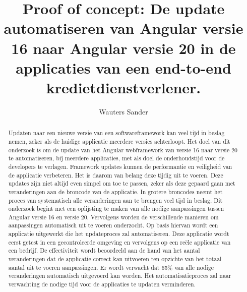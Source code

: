 \documentclass{hogent-article}
\title{Proof of concept: De update automatiseren van Angular versie 16 naar Angular versie 20 in de applicaties van een end-to-end kredietdienstverlener.}
\author{Wauters Sander}
\begin{document}
\begin{abstract}

Updaten naar een nieuwe versie van een softwareframework kan veel tijd in beslag nemen, zeker als de huidige applicatie meerdere versies achterloopt.
Het doel van dit onderzoek is om de update van het Angular webframework van versie 16 naar versie 20 te automatiseren, bij meerdere applicaties, met als doel de onderhoudstijd voor de developers te verlagen.
Framework updates kunnen de performantie en veiligheid van de applicatie verbeteren.
Het is daarom van belang deze tijdig uit te voeren.
Deze updates zijn niet altijd even simpel om toe te passen, zeker als deze gepaard gaan met veranderingen aan de broncode van de applicatie.
In grotere broncodes neemt het proces van systematisch alle veranderingen aan te brengen veel tijd in beslag.
Dit onderzoek begint met een oplijsting te maken van alle nodige aanpassingen tussen Angular versie 16 en versie 20.
Vervolgens worden de verschillende manieren om aanpassingen automatisch uit te voeren onderzocht.
Op basis hiervan wordt een applicatie uitgewerkt die het updateproces zal automatiseren.
Deze applicatie wordt eerst getest in een gecontroleerde omgeving en vervolgens op een reële applicatie van een bedrijf.
De effectiviteit wordt beoordeeld aan de hand van het aantal veranderingen dat de applicatie correct kan uitvoeren ten opzichte van het totaal aantal uit te voeren aanpassingen.
Er wordt verwacht dat 65\% van alle nodige veranderingen automatisch uitgevoerd kan worden.
Het automatisatieproces zal naar verwachting de nodige tijd voor de applicaties te updaten verminderen.

\end{abstract}

\tableofcontents



\printbibliography[heading=bibintoc]
\end{document}
